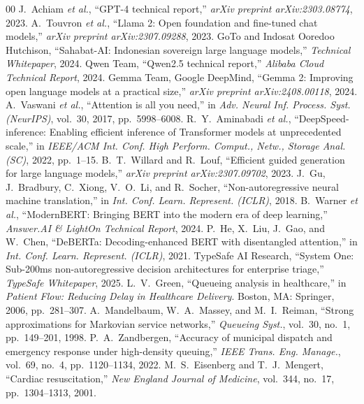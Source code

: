 \documentclass[journal,compsoc]{IEEEtran}
\begin{document}
\begin{thebibliography}{00}
 J.~Achiam \textit{et al.}, ``GPT-4 technical report,'' \textit{arXiv preprint arXiv:2303.08774}, 2023.
 A.~Touvron \textit{et al.}, ``Llama 2: Open foundation and fine-tuned chat models,'' \textit{arXiv preprint arXiv:2307.09288}, 2023.
 GoTo and Indosat Ooredoo Hutchison, ``Sahabat-AI: Indonesian sovereign large language models,'' \textit{Technical Whitepaper}, 2024.
 Qwen Team, ``Qwen2.5 technical report,'' \textit{Alibaba Cloud Technical Report}, 2024.
 Gemma Team, Google DeepMind, ``Gemma 2: Improving open language models at a practical size,'' \textit{arXiv preprint arXiv:2408.00118}, 2024.
 A.~Vaswani \textit{et al.}, ``Attention is all you need,'' in \textit{Adv. Neural Inf. Process. Syst. (NeurIPS)}, vol.~30, 2017, pp.~5998--6008.
 R.~Y.~Aminabadi \textit{et al.}, ``DeepSpeed-inference: Enabling efficient inference of Transformer models at unprecedented scale,'' in \textit{IEEE/ACM Int. Conf. High Perform. Comput., Netw., Storage Anal. (SC)}, 2022, pp.~1--15.
 B.~T.~Willard and R.~Louf, ``Efficient guided generation for large language models,'' \textit{arXiv preprint arXiv:2307.09702}, 2023.
 J.~Gu, J.~Bradbury, C.~Xiong, V.~O.~Li, and R.~Socher, ``Non-autoregressive neural machine translation,'' in \textit{Int. Conf. Learn. Represent. (ICLR)}, 2018.
 B.~Warner \textit{et al.}, ``ModernBERT: Bringing BERT into the modern era of deep learning,'' \textit{Answer.AI \& LightOn Technical Report}, 2024.
 P.~He, X.~Liu, J.~Gao, and W.~Chen, ``DeBERTa: Decoding-enhanced BERT with disentangled attention,'' in \textit{Int. Conf. Learn. Represent. (ICLR)}, 2021.
 TypeSafe AI Research, ``System One: Sub-200ms non-autoregressive decision architectures for enterprise triage,'' \textit{TypeSafe Whitepaper}, 2025.
 L.~V.~Green, ``Queueing analysis in healthcare,'' in \textit{Patient Flow: Reducing Delay in Healthcare Delivery}. Boston, MA: Springer, 2006, pp.~281--307.
 A.~Mandelbaum, W.~A.~Massey, and M.~I.~Reiman, ``Strong approximations for Markovian service networks,'' \textit{Queueing Syst.}, vol.~30, no.~1, pp.~149--201, 1998.
 P.~A.~Zandbergen, ``Accuracy of municipal dispatch and emergency response under high-density queuing,'' \textit{IEEE Trans. Eng. Manage.}, vol.~69, no.~4, pp.~1120--1134, 2022.
 M.~S.~Eisenberg and T.~J.~Mengert, ``Cardiac resuscitation,'' \textit{New England Journal of Medicine}, vol.~344, no.~17, pp.~1304--1313, 2001.
\end{thebibliography}
\end{document}
